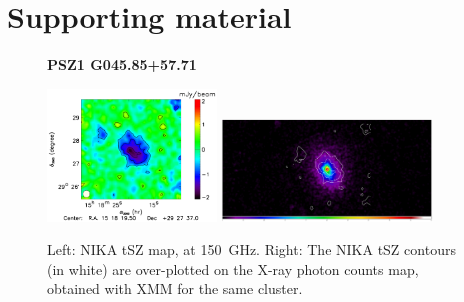 \documentclass[11pt,a4paper,twoside,graphicx,color]{article}
\begin{document}
\section{Supporting material}
\begin{figure}[h!]
	\centering
	\textbf{PSZ1 G045.85+57.71}\par\medskip
	\includegraphics[width=0.4\textwidth]{PSZ1G045_map_NIKA_2mm.pdf}
	\includegraphics[width=0.5\textwidth]{PSZ1G045_X_SZcont.pdf}
	\caption{Left: NIKA tSZ map, at 150~GHz. Right: The NIKA tSZ contours (in white) are over-plotted on the X-ray photon counts map, obtained with XMM for the same cluster.}
	\label{fig:maps}
\end{figure}
\end{document}
